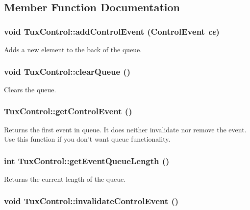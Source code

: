 \subsection{Member Function Documentation}
\hypertarget{classTuxControl_a7b81a5759a1c10cdce1627e8b6cff1f2}{
\subsubsection[{addControlEvent}]{\setlength{\rightskip}{0pt plus 5cm}void TuxControl::addControlEvent ({\bf ControlEvent} {\em ce})}}
\label{classTuxControl_a7b81a5759a1c10cdce1627e8b6cff1f2}
Adds a new element to the back of the queue. \hypertarget{classTuxControl_a3408b3c145883602c7c450c792eca529}{
\subsubsection[{clearQueue}]{\setlength{\rightskip}{0pt plus 5cm}void TuxControl::clearQueue ()}}
\label{classTuxControl_a3408b3c145883602c7c450c792eca529}
Clears the queue. \hypertarget{classTuxControl_a2b8a3437fcabe73f06b9ee20a9044000}{
\subsubsection[{getControlEvent}]{ TuxControl::getControlEvent ()}}
\label{classTuxControl_a2b8a3437fcabe73f06b9ee20a9044000}
Returns the first event in queue. It does neither invalidate nor remove the event. Use this function if you don't want queue functionality. \hypertarget{classTuxControl_a7574efb4a2375e3d33c4d3efe898a8ac}{
\subsubsection[{getEventQueueLength}]{\setlength{\rightskip}{0pt plus 5cm}int TuxControl::getEventQueueLength ()}}
\label{classTuxControl_a7574efb4a2375e3d33c4d3efe898a8ac}
Returns the current length of the queue. \hypertarget{classTuxControl_aa17c4139818a442407f0c0e8a84a9969}{
\subsubsection[{invalidateControlEvent}]{\setlength{\rightskip}{0pt plus 5cm}void TuxControl::invalidateControlEvent ()}}

